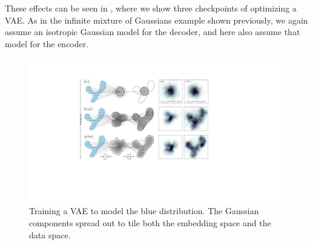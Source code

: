 These effects can be seen in \fig{\ref{fig:generative_modeling_and_representation_learning:VAE_training_iters}}, where we show three checkpoints of optimizing a VAE. As in the infinite mixture of Gaussians example shown previously, we again assume an isotropic Gaussian model for the decoder, and here also assume that model for the encoder.
\begin{figure}[h!]
    \centerline{
    \includegraphics[width=1.0\linewidth]{./figures/generative_modeling_and_representation_learning/VAE_training_iters.pdf}
    }
    \caption{Training a VAE to model the blue distribution. The Gaussian components spread out to tile both the embedding space and the data space.}
    \label{fig:generative_modeling_and_representation_learning:VAE_training_iters}
\end{figure}









